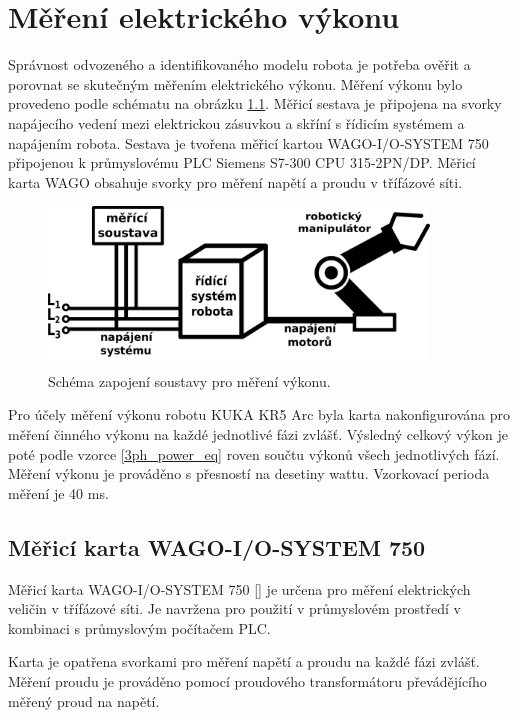 \chapter{Měření elektrického výkonu}

Správnost odvozeného a identifikovaného modelu robota je potřeba ověřit a porovnat se skutečným měřením elektrického výkonu. Měření výkonu bylo provedeno podle schématu na obrázku \ref{mereni_vykonu_pic}. Měřicí sestava je připojena na svorky napájecího vedení mezi elektrickou zásuvkou a skříní s řídicím systémem a napájením robota. Sestava je tvořena měřicí kartou WAGO-I/O-SYSTEM 750 připojenou k průmyslovému PLC Siemens S7-300 CPU 315-2PN/DP. Měřicí karta WAGO obsahuje svorky pro měření napětí a proudu v třífázové síti. 

\begin{figure}[ht]
\includegraphics[width=0.9\textwidth]{mereni_vykonu_obr}
\caption{Schéma zapojení soustavy pro měření výkonu.}
\label{mereni_vykonu_pic}
\end{figure}

Pro účely měření výkonu robotu KUKA KR5 Arc byla karta nakonfigurována pro měření činného výkonu na každé jednotlivé fázi zvlášť. Výsledný celkový výkon je poté podle vzorce \ref{3ph_power_eq} roven součtu výkonů všech jednotlivých fází. Měření výkonu je prováděno s přesností na desetiny wattu. Vzorkovací perioda měření je 40 ms. 

\section{Měřicí karta WAGO-I/O-SYSTEM 750}

Měřicí karta WAGO-I/O-SYSTEM 750 [\cite{wago}] je určena pro měření elektrických veličin v třífázové síti. Je navržena pro použití v průmyslovém prostředí v kombinaci s průmyslovým počítačem PLC. 

Karta je opatřena svorkami pro měření napětí a proudu na každé fázi zvlášť. Měření proudu je prováděno pomocí proudového transformátoru převádějícího měřený proud na napětí. 


